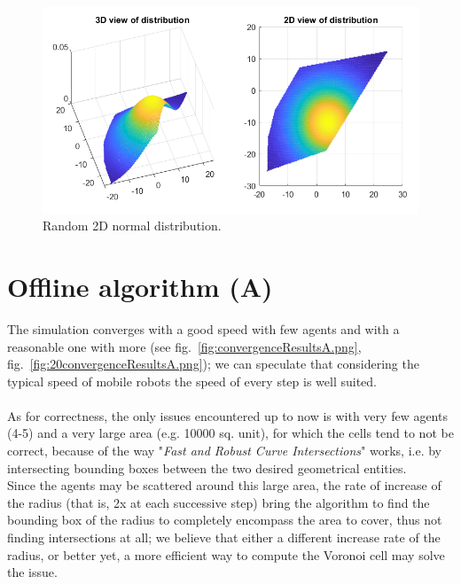 \documentclass[a4paper,11pt,oneside]{book}
\begin{document}
	\begin{figure}	
		\centering	
		\includegraphics[scale=0.7]{figs/gaussianDistrib.png}
		\caption{Random 2D normal distribution.}\label{fig:gaussianDistrib.png}	
	\end{figure}
	
	\section{Offline algorithm (A)}
	
	The simulation converges with a good speed with few agents and with a reasonable one with more (see fig.~\ref{fig:convergenceResultsA.png}, fig.~\ref{fig:20convergenceResultsA.png}); we can speculate that considering the typical speed of mobile robots the speed of every step is well suited.\\\\
	As for correctness, the only issues encountered up to now is with very few agents (4-5) and a very large area (e.g. 10000 sq. unit), for which the cells tend to not be correct, because of the way "\emph{Fast and Robust Curve Intersections}" works, i.e. by intersecting bounding boxes between the two desired geometrical entities.\\
	Since the agents may be scattered around this large area, the rate of increase of the radius (that is, 2x at each successive step) bring the algorithm to find the bounding box of the radius to completely encompass the area to cover, thus not finding intersections at all; we believe that either a different increase rate of the radius, or better yet, a more efficient way to compute the Voronoi cell may solve the issue.
	
\end{document}
